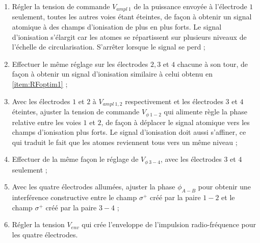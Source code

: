 \begin{enumerate}
\item \label{item:RFoptim1} Régler la tension de commande $V_{ampl~1}$ de la puissance envoyée à l'électrode $1$ seulement, toutes les autres voies étant éteintes, de façon à obtenir un signal atomique à des champs d'ionisation de plus en plus forts.
Le signal d'ionisation s'élargit car les atomes se répartissent sur plusieurs niveaux de l'échelle de circularisation.
S'arrêter lorsque le signal se perd ;
\item Effectuer le même réglage sur les électrodes $2,3$ et $4$ chacune à son tour, de façon à obtenir un signal d'ionisation similaire à celui obtenu en \ref{item:RFoptim1} ;
\item Avec les électrodes $1$ et $2$ à $V_{ampl~1,2}$ respectivement et les électrodes $3$ et $4$ éteintes, ajuster la tension de commande $V_{\phi~1-2}$ qui alimente règle la phase relative entre les voies $1$ et $2$, de façon à déplacer le signal atomique vers les champs d'ionisation plus forts.
Le signal d'ionisation doit aussi s'affiner, ce qui traduit le fait que les atomes  reviennent tous vers un même niveau ;
\item Effectuer de la même façon le réglage de $V_{\phi~3-4}$, avec les électrodes $3$ et $4$ seulement ;
\item Avec les quatre électrodes allumées, ajuster la phase $\phi_{A-B}$ pour obtenir une interférence constructive entre le champ $\sigma^+$ créé par la paire $1-2$ et le champ $\sigma^+$ créé par la paire $3-4$ ;
\item Régler la tension $V_{env}$ qui crée l'enveloppe de l'impulsion radio-fréquence pour les quatre électrodes.
\end{enumerate}

